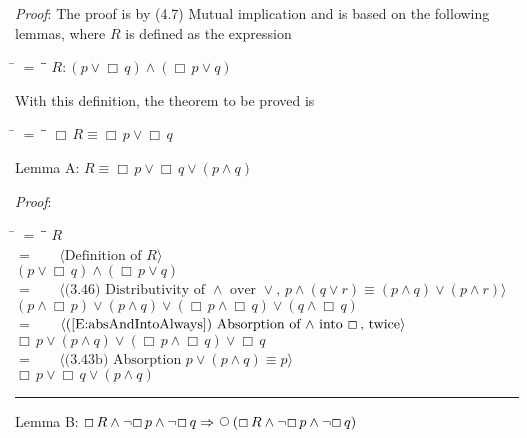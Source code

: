 \documentclass[12pt, fleqn, leqno]{article}
\newcommand{\lgap}{2pt}                             %
\newcommand{\mymathindent}{24pt}                    %
\newcommand{\impl}{\ensuremath{\Rightarrow}}        %
\newcommand{\Next}{\;\,\text{\raisebox{3.5pt}{\circle{6}}}}
\newcommand{\Always}{\Box\,}
\newcommand{\myqed}{\rule[-.23ex]{1.2ex}{2.0ex}}
\newcommand{\myqedtab}{\hspace{384pt}}              %
\newcommand{\Gll} {\langle}                         %
\newcommand{\Ggg} {\rangle}                         %
\newcommand{\Hint}[1]     {\ \ \ $\Gll              \mbox{#1} \Ggg$ }   %
\begin{document}
\emph{Proof}: The proof is by (4.7) Mutual implication and is based on the following lemmas, where $R$ is defined as the expression
\begin{tabbing}
\hspace{\mymathindent} \= $= \;$ \= \myqedtab \= \kill
  \> $R: (p \lor \Always q) \land (\Always p \lor q)$
\end{tabbing}
With this definition, the theorem to be proved is
\begin{tabbing}
\hspace{\mymathindent} \= $= \;$ \= \myqedtab \= \kill
  \> $\Always R \equiv \Always p \lor \Always q$
\end{tabbing}
Lemma A: $R \equiv \Always p \lor \Always q \lor (p \land q)$

\emph{Proof}:
\begin{tabbing}
\hspace{\mymathindent} \= $= \;$ \= \myqedtab \= \kill
  \> \>   $R$\\[\lgap]
  \> $=$ \> \Hint{Definition of $R$} \\[\lgap]
  \> \>   $(p \lor \Always q) \land (\Always p \lor q)$\\[\lgap]
  \> $=$ \> \Hint{(3.46) Distributivity of $\land$ over $\lor$, $p\land (q\lor r)\equiv (p\land q)\lor (p\land r)$} \\[\lgap]
  \> \>   $(p \land \Always p) \lor (p \land q) \lor (\Always p \land \Always q) \lor (q \land \Always q)$\\[\lgap]
  \> $=$  \>  \Hint{(\ref{E:absAndIntoAlways}) Absorption of $\land$ into $\Always$, twice}\\[\lgap]
  \> \>   $\Always p \lor (p \land q) \lor (\Always p \land \Always q) \lor \Always q $\\[\lgap]
  \> $=$ \> \Hint{(3.43b) Absorption $p \lor (p \land q) \equiv p$} \\[\lgap]
  \> \>   $\Always p \lor \Always q \lor (p \land q)$ \quad \myqed
\end{tabbing}
Lemma B: $\Always R \land \neg \Always p \land \neg \Always q \impl \Next (\Always R \land \neg \Always p \land \neg \Always q)$
\end{document}
